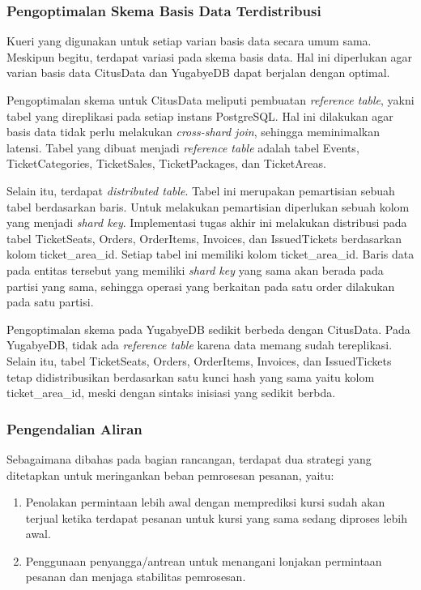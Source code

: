 \subsubsection{Pengoptimalan Skema Basis Data Terdistribusi}

Kueri yang digunakan untuk setiap varian basis data secara umum sama. Meskipun begitu, terdapat variasi pada skema basis data. Hal ini diperlukan agar varian basis data CitusData dan YugabyeDB dapat berjalan dengan optimal.

Pengoptimalan skema untuk CitusData meliputi pembuatan \textit{reference table}, yakni tabel yang direplikasi pada setiap instans PostgreSQL. Hal ini dilakukan agar basis data tidak perlu melakukan \textit{cross-shard join}, sehingga meminimalkan latensi. Tabel yang dibuat menjadi \textit{reference table} adalah tabel Events, TicketCategories, TicketSales, TicketPackages, dan TicketAreas.

Selain itu, terdapat \textit{distributed table}. Tabel ini merupakan pemartisian sebuah tabel berdasarkan baris. Untuk melakukan pemartisian diperlukan sebuah kolom yang menjadi \textit{shard key}. Implementasi tugas akhir ini melakukan distribusi pada tabel TicketSeats, Orders, OrderItems, Invoices, dan IssuedTickets berdasarkan kolom ticket\_area\_id. Setiap tabel ini memiliki kolom ticket\_area\_id. Baris data pada entitas tersebut yang memiliki \textit{shard key} yang sama akan berada pada partisi yang sama, sehingga operasi yang berkaitan pada satu order dilakukan pada satu partisi.

Pengoptimalan skema pada YugabyeDB sedikit berbeda dengan CitusData. Pada YugabyeDB, tidak ada \textit{reference table} karena data memang sudah tereplikasi. Selain itu, tabel TicketSeats, Orders, OrderItems, Invoices, dan IssuedTickets tetap didistribusikan berdasarkan satu kunci hash yang sama yaitu kolom ticket\_area\_id, meski dengan sintaks inisiasi yang sedikit berbda.

\subsubsection{Pengendalian Aliran}

Sebagaimana dibahas pada bagian rancangan, terdapat dua strategi yang ditetapkan untuk meringankan beban pemrosesan pesanan, yaitu:

\begin{enumerate}
    \item Penolakan permintaan lebih awal dengan memprediksi kursi sudah akan terjual ketika terdapat pesanan untuk kursi yang sama sedang diproses lebih awal.
    \item Penggunaan penyangga/antrean untuk menangani lonjakan permintaan pesanan dan menjaga stabilitas pemrosesan.
\end{enumerate}

